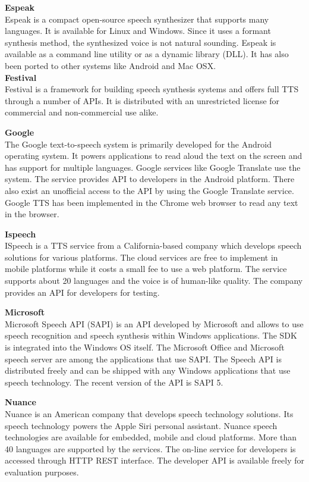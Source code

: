 \documentclass[11pt,a4paper,oneside,article]{memoir}
\begin{document}
\textbf{Espeak}\\
Espeak is a compact open-source speech synthesizer that supports many languages. It is available for Linux and Windows. Since it uses a formant synthesis method, the synthesized voice is not natural sounding. Espeak is available as a command line utility or as a dynamic library (DLL). It has also been ported to other systems like Android and Mac OSX. \cite{espeak}\\

\textbf{Festival} \\
Festival is a framework for building speech synthesis systems and offers full TTS through a number of APIs. It is distributed with an unrestricted license for commercial and non-commercial use alike. \cite{festival}

\textbf{Google}\\
The Google text-to-speech system is primarily developed for the Android operating system. It powers applications to read aloud the text on the screen and has support for multiple languages. Google services like Google Translate use the system. The service provides API to developers in the Android platform. There also exist an unofficial access to the API by using the Google Translate service. Google TTS has been implemented in the Chrome web browser to read any text in the browser. 

\textbf{Ispeech}\\
ISpeech is a TTS service from a California-based company which develops speech solutions for various platforms. The cloud services are free to implement in mobile platforms while it costs a small fee to use a web platform. The service supports about 20 languages and the voice is of human-like quality. The company provides an API for developers for testing. \cite{ispeech}

\textbf{Microsoft}\\
Microsoft Speech API (SAPI) is an API developed by Microsoft and allows to use speech recognition and speech synthesis within Windows applications. The SDK is integrated into the Windows OS itself. The Microsoft Office and Microsoft speech server are among the applications that use SAPI. The Speech API is distributed freely and can be shipped with any Windows applications that use speech technology. The recent version of the API is SAPI 5. \cite{microsoft}

\textbf{Nuance}\\
Nuance is an American company that develops speech technology solutions. Its speech technology powers the Apple Siri personal assistant.  Nuance speech technologies are available for embedded, mobile and cloud platforms. More than 40 languages are supported by the services. The on-line service for developers is accessed through HTTP REST interface. The developer API is available freely for evaluation purposes. \cite{nuance}
\end{document}
